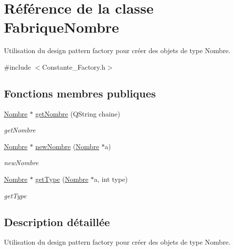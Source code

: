 \hypertarget{class_fabrique_nombre}{\section{Référence de la classe Fabrique\-Nombre}
\label{class_fabrique_nombre}
}


Utilisation du design pattern factory pour créer des objets de type Nombre.  




{\ttfamily \#include $<$Constante\-\_\-\-Factory.\-h$>$}

\subsection*{Fonctions membres publiques}
\begin{DoxyCompactItemize}
\item 
\hyperlink{class_calcul_1_1_nombre}{Nombre} $\ast$ \hyperlink{class_fabrique_nombre_addd29295516c6899e5f7901595fdeddc}{get\-Nombre} (Q\-String chaine)
\begin{DoxyCompactList}\small\item\em get\-Nombre \end{DoxyCompactList}\item 
\hyperlink{class_calcul_1_1_nombre}{Nombre} $\ast$ \hyperlink{class_fabrique_nombre_ab2284f484135ef2bc05f9d83fc37a76f}{new\-Nombre} (\hyperlink{class_calcul_1_1_nombre}{Nombre} $\ast$a)
\begin{DoxyCompactList}\small\item\em new\-Nombre \end{DoxyCompactList}\item 
\hyperlink{class_calcul_1_1_nombre}{Nombre} $\ast$ \hyperlink{class_fabrique_nombre_a499d63c9f3da120b74a6b4a830f61aff}{get\-Type} (\hyperlink{class_calcul_1_1_nombre}{Nombre} $\ast$a, int type)
\begin{DoxyCompactList}\small\item\em get\-Type \end{DoxyCompactList}\end{DoxyCompactItemize}


\subsection{Description détaillée}
Utilisation du design pattern factory pour créer des objets de type Nombre. 

